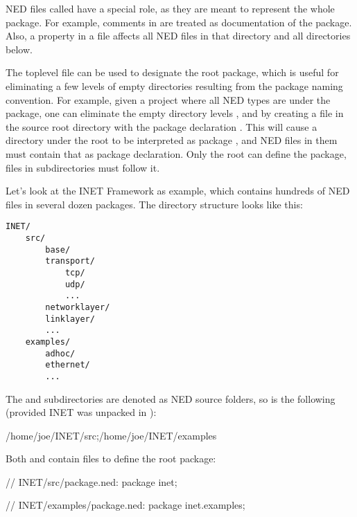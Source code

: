 NED files called  have a special role, as they are meant
to represent the whole package. For example, comments in
 are treated as documentation of the package. Also, a
 property in a  file affects all NED
files in that directory and all directories below.

The toplevel  file can be used to designate the root
package, which is useful for eliminating a few levels of empty directories
resulting from the package naming convention. For example, given a project
where all NED types are under the  package, one can
eliminate the empty directory levels ,  and  by
creating a  file in the source root directory with
the package declaration . This will cause a
directory  under the root to be interpreted as package
, and NED files in them must contain that as
package declaration. Only the root  can define the
package,  files in subdirectories must follow it.

Let's look at the INET Framework as example, which contains hundreds of NED
files in several dozen packages. The directory structure looks like this:

\begin{Verbatim}
INET/
    src/
        base/
        transport/
            tcp/
            udp/
            ...
        networklayer/
        linklayer/
        ...
    examples/
        adhoc/
        ethernet/
        ...
\end{Verbatim}

The  and  subdirectories are denoted as NED source
folders, so  is the following (provided INET was unpacked in
):

\begin{filelisting}
/home/joe/INET/src;/home/joe/INET/examples
\end{filelisting}

Both  and  contain  files to
define the root package:

\begin{ned}
// INET/src/package.ned:
package inet;
\end{ned}

\begin{ned}
// INET/examples/package.ned:
package inet.examples;
\end{ned}

